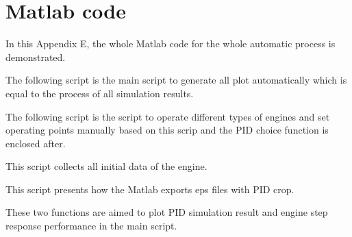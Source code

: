  \chapter{Matlab code}\label{cha:code} 
 In this Appendix E, the whole Matlab code for the whole automatic process is demonstrated.

 
The following script is the main script to generate all plot automatically which is equal to the process of all simulation results.


The following script is the script to operate different types of engines and set operating points manually based on this scrip and the PID choice function is enclosed after.



This script collects all initial data of the engine.


This script presents how the Matlab exports eps files with PID crop.


These two functions are aimed to plot PID simulation result and engine step response performance in the main script.


